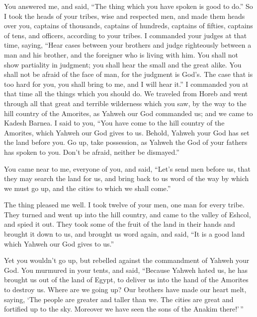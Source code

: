  You answered me, and said, ``The thing which you have
spoken is good to do.''  So I took the heads of your
tribes, wise and respected men, and made them heads over you, captains
of thousands, captains of hundreds, captains of fifties, captains of
tens, and officers, according to your tribes.  I commanded
your judges at that time, saying, ``Hear cases between your brothers and
judge righteously between a man and his brother, and the foreigner who
is living with him.  You shall not show partiality in
judgment; you shall hear the small and the great alike. You shall not be
afraid of the face of man, for the judgment is God's. The case that is
too hard for you, you shall bring to me, and I will hear it.''
 I commanded you at that time all the things which you
should do.  We traveled from Horeb and went through all
that great and terrible wilderness which you saw, by the way to the hill
country of the Amorites, as Yahweh our God commanded us; and we came to
Kadesh Barnea.  I said to you, ``You have come to the hill
country of the Amorites, which Yahweh our God gives to us. 
Behold, Yahweh your God has set the land before you. Go up, take
possession, as Yahweh the God of your fathers has spoken to you. Don't
be afraid, neither be dismayed.''

 You came near to me, everyone of you, and said, ``Let's
send men before us, that they may search the land for us, and bring back
to us word of the way by which we must go up, and the cities to which we
shall come.''

 The thing pleased me well. I took twelve of your men, one
man for every tribe.  They turned and went up into the hill
country, and came to the valley of Eshcol, and spied it out.
 They took some of the fruit of the land in their hands and
brought it down to us, and brought us word again, and said, ``It is a
good land which Yahweh our God gives to us.''

 Yet you wouldn't go up, but rebelled against the
commandment of Yahweh your God.  You murmured in your
tents, and said, ``Because Yahweh hated us, he has brought us out of the
land of Egypt, to deliver us into the hand of the Amorites to destroy
us.  Where are we going up? Our brothers have made our
heart melt, saying, `The people are greater and taller than we. The
cities are great and fortified up to the sky. Moreover we have seen the
sons of the Anakim there!'\,''

